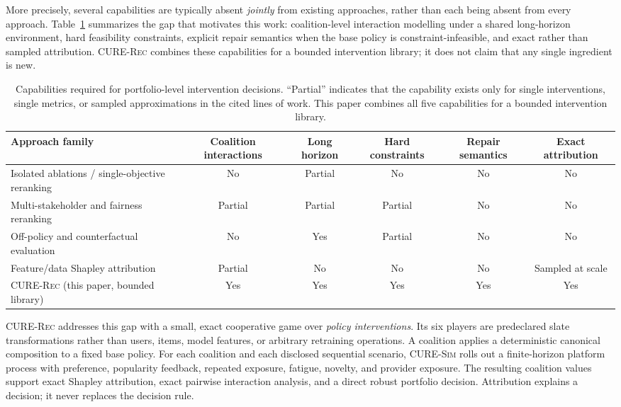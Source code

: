 \documentclass[pdflatex,sn-mathphys-num]{sn-jnl}
\theoremstyle{thmstyleone}
\theoremstyle{thmstyletwo}
\theoremstyle{thmstylethree}
\newcommand{\CURE}{\textsc{CURE-Rec}}
\newcommand{\Sim}{\textsc{CURE-Sim}}
\begin{document}
More precisely, several capabilities are typically absent \emph{jointly} from existing approaches, rather than each being absent from every approach. Table~\ref{tab:capability-gap} summarizes the gap that motivates this work: coalition-level interaction modelling under a shared long-horizon environment, hard feasibility constraints, explicit repair semantics when the base policy is constraint-infeasible, and exact rather than sampled attribution. \CURE{} combines these capabilities for a bounded intervention library; it does not claim that any single ingredient is new.

\begin{table}[t]
\caption{Capabilities required for portfolio-level intervention decisions. ``Partial'' indicates that the capability exists only for single interventions, single metrics, or sampled approximations in the cited lines of work. This paper combines all five capabilities for a bounded intervention library.}\label{tab:capability-gap}
\centering
\small
\setlength{\tabcolsep}{4pt}
\begin{tabularx}{\textwidth}{@{}p{}ccccc@{}}
\toprule
Approach family & Coalition interactions & Long horizon & Hard constraints & Repair semantics & Exact attribution\\
\midrule
Isolated ablations / single-objective reranking \cite{ziegler2005improving,vargas2011rank,abdollahpouri2019popularity} & No & Partial & No & No & No\\
Multi-stakeholder and fairness reranking \cite{burke2018multistakeholder,singh2018fairness,ekstrand2022fairness} & Partial & Partial & Partial & No & No\\
Off-policy and counterfactual evaluation \cite{swaminathan2015counterfactual,joachims2017unbiased,kallus2020efficient} & No & Yes & Partial & No & No\\
Feature/data Shapley attribution \cite{lundberg2017shap,mcelfresh2023shapley} & Partial & No & No & No & Sampled at scale\\
\CURE{} (this paper, bounded library) & Yes & Yes & Yes & Yes & Yes\\
\bottomrule
\end{tabularx}
\end{table}

\CURE{} addresses this gap with a small, exact cooperative game over \emph{policy interventions}. Its six players are predeclared slate transformations rather than users, items, model features, or arbitrary retraining operations. A coalition applies a deterministic canonical composition to a fixed base policy. For each coalition and each disclosed sequential scenario, \Sim{} rolls out a finite-horizon platform process with preference, popularity feedback, repeated exposure, fatigue, novelty, and provider exposure. The resulting coalition values support exact Shapley attribution, exact pairwise interaction analysis, and a direct robust portfolio decision. Attribution explains a decision; it never replaces the decision rule.
\end{document}
